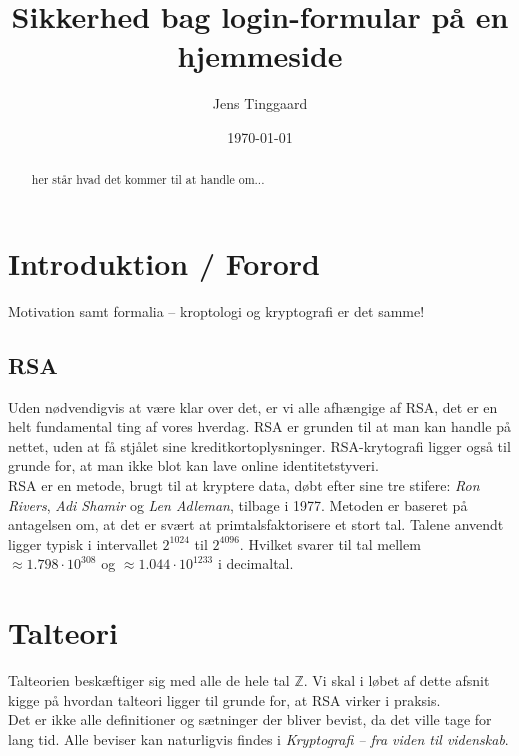 \documentclass[a4paper, 12pt]{article}
\date{\today}
\title{Sikkerhed bag login-formular på en hjemmeside}
\author{Jens Tinggaard}
\theoremstyle{break}
\theoremstyle{breakline}
\theoremstyle{beviser}
\begin{document}
\clearpage\maketitle
\thispagestyle{empty}
\maketitle

\begin{abstract} %
her står hvad det kommer til at handle om...
\end{abstract}



\newpage
\tableofcontents


\newpage
\section*{Introduktion / Forord}
Motivation samt formalia -- kroptologi og kryptografi er det samme!


\subsection*{RSA}
Uden nødvendigvis at være klar over det, er vi alle afhængige af RSA, det er en helt fundamental ting af vores hverdag.
RSA er grunden til at man kan handle på nettet, uden at få stjålet sine kreditkortoplysninger.
RSA-krytografi ligger også til grunde for, at man ikke blot kan lave online identitetstyveri.\cite{vestergaard}
\\

RSA er en metode, brugt til at kryptere data, døbt efter sine tre stifere:
\textit{Ron Rivers}, \textit{Adi Shamir} og \textit{Len Adleman}, tilbage i 1977.\cite{vestergaard}
Metoden er baseret på antagelsen om, at det er svært at primtalsfaktorisere et stort tal.
Talene anvendt ligger typisk i intervallet \(2^{1024}\) til \(2^{4096}\).
Hvilket svarer til tal mellem \(\approx 1.798 \cdot 10^{308}\) og \(\approx 1.044 \cdot 10^{1233}\) i decimaltal.\cite[21]{frividen}



\newpage
\section{Talteori}
Talteorien beskæftiger sig med alle de hele tal \(\mathbb{Z}\).
Vi skal i løbet af dette afsnit kigge på hvordan talteori ligger til grunde for, at RSA virker i praksis.
\\
Det er ikke alle definitioner og sætninger der bliver bevist, da det ville tage for lang tid.
Alle beviser kan naturligvis findes i \textit{Kryptografi -- fra viden til videnskab}. \cite{krypto}
\end{document}
